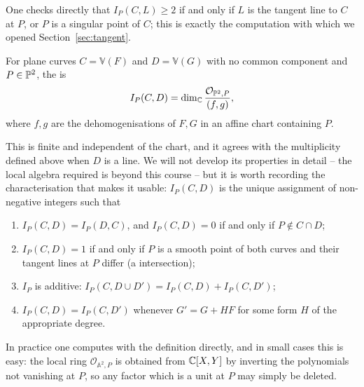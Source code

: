 \documentclass[a4paper]{scrartcl}
\newcommand{\A}{\mathbb{A}}
\newcommand{\V}{\mathbb{V}}
\newcommand{\Oh}{\mathcal{O}}
\begin{document}
One checks directly that $I_P(C,L) \geq 2$ if and only if $L$ is the tangent line to $C$ at $P$, or $P$ is a singular point of $C$; this is exactly the computation with which we opened Section~\ref{sec:tangent}.

\begin{definition}
	For plane curves $C = \V(F)$ and $D = \V(G)$ with no common component and $P \in \mathbb{P}^2$, the  is
	$$I_P(C,D) = \dim_\C \frac{\Oh_{\PP^2,P}}{(f,g)},$$
	where $f,g$ are the dehomogenisations of $F,G$ in an affine chart containing $P$.
\end{definition}

This is finite and independent of the chart, and it agrees with the multiplicity defined above when $D$ is a line. We will not develop its properties in detail -- the local algebra required is beyond this course -- but it is worth recording the characterisation that makes it usable: $I_P(C,D)$ is the unique assignment of non-negative integers such that
\begin{enumerate}[label=(\roman*)]
	\item $I_P(C,D) = I_P(D,C)$, and $I_P(C,D) = 0$ if and only if $P \notin C\cap D$;
	\item $I_P(C,D) = 1$ if and only if $P$ is a smooth point of both curves and their tangent lines at $P$ differ (a  intersection);
	\item $I_P$ is additive: $I_P(C, D\cup D') = I_P(C,D) + I_P(C,D')$;
	\item $I_P(C,D) = I_P(C, D')$ whenever $G' = G + HF$ for some form $H$ of the appropriate degree.
\end{enumerate}

In practice one computes with the definition directly, and in small cases this is easy: the local ring $\Oh_{\A^2,P}$ is obtained from $\mathbb{C}[X,Y]$ by inverting the polynomials not vanishing at $P$, so any factor which is a unit at $P$ may simply be deleted.
\end{document}
